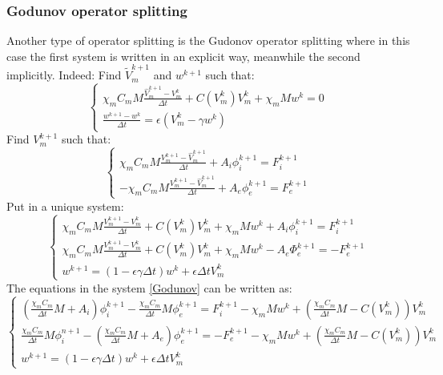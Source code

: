 \documentclass[a4paper,12pt]{article}
\begin{document}
\subsubsection{Godunov operator splitting}
Another type of operator splitting is the Gudonov operator splitting where in this case the first system is written in an explicit way, meanwhile the second implicitly. Indeed:\newline
Find $\tilde{V}_m^{k+1}$ and $w^{k+1}$ such that:
\begin{equation*}
\begin{cases}
\chi_m C_m M\frac{\hat{V}_m^{k+1} - V_m^k}{\Delta t} + C(V_m^k)V_m^k +\chi_mMw^k = 0\\
\frac{w^{k+1}-w^k}{\Delta t} = \epsilon (V_m^k - \gamma w^k)
\end{cases}
\end{equation*}
Find $V_m^{k+1}$ such that:
\begin{equation*}
\begin{cases}
\chi_m C_m M\frac{V_m^{k+1} - \hat{V}_m^{k+1}}{\Delta t} + A_i\phi_i^{k+1} = F_i^{k+1} \\
-\chi_m C_m M\frac{V_m^{k+1} - \hat{V}_m^{k+1}}{\Delta t} + A_e\phi_e^{k+1} = F_e^{k+1}
\end{cases}
\end{equation*}
Put in a unique system:
\begin{equation}\label{Godunov}
\begin{cases}
\chi_m C_m M\frac{V_m^{k+1} - V_m^k}{\Delta t} + C(V_m^k)V_m^k +\chi_mMw^k + A_i \phi_i^{k+1}= F_i^{k+1} \\
\chi_m C_m M\frac{V_m^{k+1} - V_m^k}{\Delta t} + C(V_m^k)V_m^k +\chi_mMw^k - A_e \Phi_e^{k+1}= -F_e^{k+1} \\
w^{k+1} = (1-\epsilon \gamma \Delta t) w^k + \epsilon \Delta t V_m^k
\end{cases}
\end{equation}
The equations in the system \ref{Godunov} can be written as:
\begin{equation*}
\begin{cases}
\left( \frac{\chi_m C_m}{\Delta t} M + A_i \right ) \phi_i^{k+1} - \frac{\chi_m C_m}{\Delta t} M \phi_e^{k+1} = F_i^{k+1} - \chi_m M w^k + \left( \frac{\chi_m C_m}{\Delta t} M- C(V_m^k)\right) V_m^k\\
\frac{\chi_m C_m}{\Delta t} M  \phi_i^{n+1} - \left(\frac{\chi_m C_m}{\Delta t} M + A_e \right) \phi_e^{k+1} =  -F_e^{k+1} - \chi_m M w^k + \left( \frac{\chi_m C_m}{\Delta t} M- C(V_m^k)\right) V_m^k \\
w^{k+1} = (1-\epsilon \gamma \Delta t) w^k + \epsilon \Delta tV_m^k
\end{cases}
\end{equation*}
\end{document}
